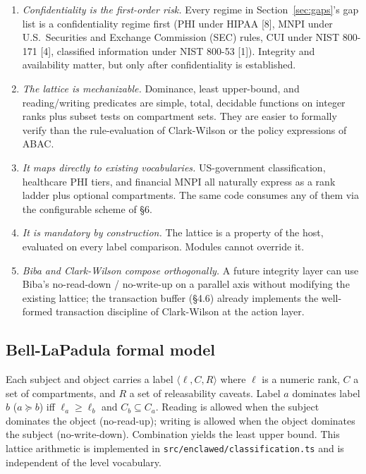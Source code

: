 \documentclass[11pt]{article}
\begin{document}
\begin{enumerate}
  \item \emph{Confidentiality is the first-order risk.} Every regime in
    Section~\ref{sec:gaps}'s gap list is a confidentiality regime first
    (PHI under HIPAA [8], MNPI under U.S.\ Securities and Exchange
    Commission (SEC) rules, CUI under NIST 800-171 [4], classified
    information under NIST 800-53 [1]). Integrity and availability
    matter, but only after confidentiality is established.
  \item \emph{The lattice is mechanizable.} Dominance, least
    upper-bound, and reading/writing predicates are simple, total,
    decidable functions on integer ranks plus subset tests on
    compartment sets. They are easier to formally verify than the
    rule-evaluation of Clark-Wilson or the policy expressions of ABAC.
  \item \emph{It maps directly to existing vocabularies.} US-government
    classification, healthcare PHI tiers, and financial MNPI all
    naturally express as a rank ladder plus optional compartments. The
    same code consumes any of them via the configurable scheme of §6.
  \item \emph{It is mandatory by construction.} The lattice is a
    property of the host, evaluated on every label comparison. Modules
    cannot override it.
  \item \emph{Biba and Clark-Wilson compose orthogonally.} A future
    integrity layer can use Biba's no-read-down / no-write-up on a
    parallel axis without modifying the existing lattice; the
    transaction buffer (§4.6) already implements the well-formed
    transaction discipline of Clark-Wilson at the action layer.
\end{enumerate}

\subsection{Bell-LaPadula formal model}

Each subject and object carries a label $\langle \ell, C, R \rangle$
where $\ell$ is a numeric rank, $C$ a set of compartments, and $R$ a
set of releasability caveats. Label $a$ dominates label $b$ ($a
\succeq b$) iff $\ell_a \geq \ell_b$ and $C_b \subseteq C_a$. Reading
is allowed when the subject dominates the object (no-read-up); writing
is allowed when the object dominates the subject (no-write-down).
Combination yields the least upper bound. This lattice arithmetic is
implemented in \texttt{src/enclawed/classification.ts} and is
independent of the level vocabulary.
\end{document}
